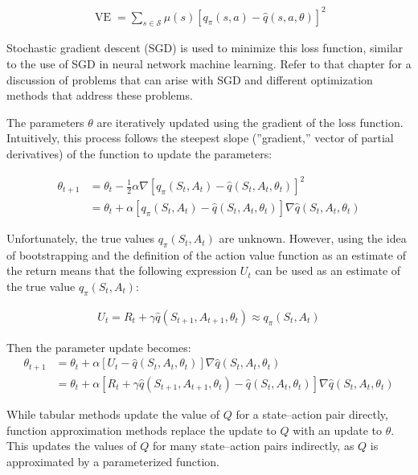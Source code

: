 \begin{align*}
\operatorname{VE} = \sum_{s \in \mathcal{S}} \mu(s) \left[ q_\pi(s, a) - \hat{q}(s, a, \theta) \right]^2
\end{align*}

Stochastic gradient descent (SGD) is used to minimize this loss function, similar to the use of SGD in neural network machine learning. Refer to that chapter for a discussion of problems that can arise with SGD and different optimization methods that address these problems. 

The parameters $\theta$ are iteratively updated using the gradient of the loss function. Intuitively, this process follows the steepest slope (''gradient,'' vector of partial derivatives) of the function to update the parameters:

\begin{align*}
\theta_{t+1} &= \theta_t - \frac{1}{2} \alpha \nabla \left[ q_\pi(S_t, A_t) - \hat{q}(S_t, A_t,  \theta_t)\right]^2 \\
 &= \theta_t + \alpha \left[ q_\pi(S_t, A_t) - \hat{q}(S_t, A_t, \theta_t)\right] \nabla \hat{q}(S_t, A_t, \theta_t)
\end{align*}

Unfortunately, the true values $q_\pi(S_t, A_t)$ are unknown. However, using the idea of bootstrapping and the definition of the action value function as an estimate of the return means that the following expression $U_t$ can be used as an estimate of the true value $q_\pi(S_t, A_t)$: 

\begin{align*}
U_t = R_t + \gamma \hat{q}(S_{t+1}, A_{t+1}, \theta_t) \approx q_\pi(S_t, A_t)
\end{align*}

Then the parameter update becomes:
\begin{align}
\theta_{t+1} &= \theta_t + \alpha \left[ U_t - \hat{q}(S_t, A_t, \theta_t)\right] \nabla \hat{q}(S_t, A_t, \theta_t) \label{eq:dqnupdate} \\
 &= \theta_t + \alpha \left[ R_t + \gamma \hat{q}(S_{t+1}, A_{t+1}, \theta_t) - \hat{q}(S_t, A_t, \theta_t)\right] \nabla \hat{q}(S_t, A_t, \theta_t) \nonumber
\end{align}

\begin{tcolorbox}[colback=alert]
While tabular methods update the value of $Q$ for a state--action pair directly, function approximation methods replace the update to $Q$ with an update to $\theta$. This updates the values of $Q$ for many state--action pairs indirectly, as $Q$ is approximated by a parameterized function.
\end{tcolorbox}

